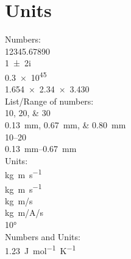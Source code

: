 \documentclass[hyperpdf,bindnopdf,twocolumn]{article}
\begin{document}
    \section{Units}
    Numbers:\\
        \num{12345,67890} \\
        \num{1+-2i}       \\
        \num{.3e45}       \\
        \num{1.654 x 2.34 x 3.430}\\

    List/Range of numbers:\\
        \numlist{10;20;30}                    \\
        \SIlist{0.13;0.67;0.80}{\milli\metre} \\
        \numrange{10}{20}                     \\
        \SIrange{0.13}{0.67}{\milli\metre}\\

    Units:\\
        \si{kg.m.s^{-1}}                \\
        \si{\kilogram\metre\per\second} \\
        \si[per-mode=symbol]
        {\kilogram\metre\per\second}  \\
        \si[per-mode=symbol]
        {\kilogram\metre\per\ampere\per\second}\\
        \ang{10}\\ %

    Numbers and Units:\\
        \SI[mode=text]{1.23}{J.mol^{-1}.K^{-1}}\\
\end{document}
